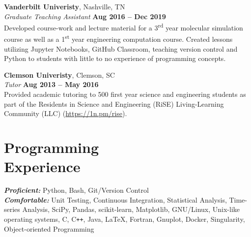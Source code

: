 \documentclass[margin,line]{resume}
\begin{document}
\begin{resume}
    \textbf{Vanderbilt Univeristy}, Nashville, TN \vspace{2mm}\\\vspace{1mm}%
    \textsl{Graduate Teaching Assistant} \hfill \textbf{Aug 2016 -- Dec 2019}\\
    Developed course-work and lecture material for a 3\textsuperscript{rd} year molecular simulation course as well as a 1\textsuperscript{st} year engineering computation course.
    Created lessons utilizing Jupyter Notebooks, GitHub Classroom, teaching version control and Python to students with little to no experience of programming concepts.

    \textbf{Clemson Univeristy}, Clemson, SC \vspace{2mm}\\\vspace{1mm}%
    \textsl{Tutor} \hfill \textbf{Aug 2013 -- May 2016}\\
    Provided academic tutoring to 500 first year science and engineering students as part of the Residents in Science and Engineering (RiSE) Living-Learning Community (LLC) (\url{https://1n.pm/rise}).

    \section{\mysidestyle Programming\\Experience}

    \emph{\textbf{Proficient:}} Python, Bash, Git/Version Control\\
    \emph{\textbf{Comfortable:}} Unit Testing, Continuous Integration, Statistical Analysis, Time-series Analysis, SciPy, Pandas, scikit-learn, Matplotlib, GNU/Linux, Unix-like operating systems, C, C\texttt{++}, Java, \LaTeX, Fortran, Gnuplot, Docker, Singularity, Object-oriented Programming
\end{resume}
\end{document}
